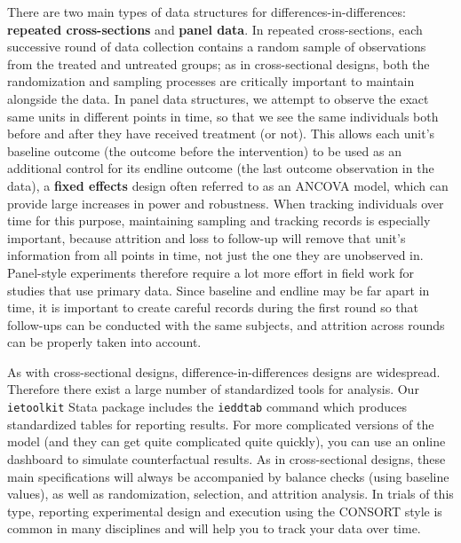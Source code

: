 There are two main types of data structures for differences-in-differences:
\textbf{repeated cross-sections} and \textbf{panel data}.
In repeated cross-sections, each successive round of data collection contains a random sample
of observations from the treated and untreated groups;
as in cross-sectional designs, both the randomization and sampling processes
are critically important to maintain alongside the data.
In panel data structures, we attempt to observe the exact same units
in different points in time, so that we see the same individuals
both before and after they have received treatment (or not).
This allows each unit's baseline outcome (the outcome before the intervention) to be used
as an additional control for its endline outcome (the last outcome observation in the data),
a \textbf{fixed effects} design often referred to as an ANCOVA model,
which can provide large increases in power and robustness.
When tracking individuals over time for this purpose,
maintaining sampling and tracking records is especially important,
because attrition and loss to follow-up will remove that unit's information
from all points in time, not just the one they are unobserved in.
Panel-style experiments therefore require a lot more effort in field work
for studies that use primary data.
Since baseline and endline may be far apart in time,
it is important to create careful records during the first round
so that follow-ups can be conducted with the same subjects,
and attrition across rounds can be properly taken into account.

As with cross-sectional designs, difference-in-differences designs are widespread.
Therefore there exist a large number of standardized tools for analysis.
Our \texttt{ietoolkit} Stata package includes the \texttt{ieddtab} command
which produces standardized tables for reporting results.
For more complicated versions of the model
(and they can get quite complicated quite quickly),
you can use an online dashboard to simulate counterfactual results.
As in cross-sectional designs, these main specifications
will always be accompanied by balance checks (using baseline values),
as well as randomization, selection, and attrition analysis.
In trials of this type, reporting experimental design and execution
using the CONSORT style is common in many disciplines
and will help you to track your data over time.\cite{schulz2010consort}

